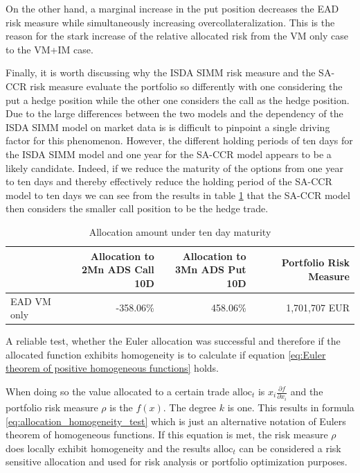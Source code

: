 \documentclass[../Thesis_AHoecherl.tex]{subfiles}
\begin{document}
    On the other hand, a marginal increase in the put position decreases the \gls{EAD} risk measure while simultaneously increasing overcollateralization. This is the reason for the stark increase of the relative allocated risk from the \gls{VM} only case to the \gls{VM}+IM case.

    Finally, it is worth discussing why the \gls{ISDA SIMM} risk measure and the \gls{SA-CCR} risk measure evaluate the portfolio so differently with one considering the put a hedge position while the other one considers the call as the hedge position.
    Due to the large differences between the two models and the dependency of the \gls{ISDA SIMM} model on market data is is difficult to pinpoint a single driving factor for this phenomenon.
    However, the different holding periods of ten days for the \gls{ISDA SIMM} model and one year for the \gls{SA-CCR} model appears to be a likely candidate. Indeed, if we reduce the maturity of the options from one year to ten days and thereby effectively reduce the holding period of the \gls{SA-CCR} model to ten days we can see from the results in table \ref{tab:2TradeEquity10dayEAD} that the \gls{SA-CCR} model then considers the smaller call position to be the hedge trade.

    \begin{table}[htbp]
        \centering
        \begin{tabular}{l||r|r|r}
                & \makecell{Allocation to \\ 2Mn ADS Call 10D} & \makecell{Allocation to \\ 3Mn ADS Put 10D} & Portfolio Risk Measure \\
                \toprule
                \gls{EAD} \gls{VM} only & -358.06\% & 458.06\% & 1,701,707 EUR \\
        \end{tabular}%
        \caption{Allocation amount under ten day maturity}
        \label{tab:2TradeEquity10dayEAD}%
    \end{table}%

    A reliable test, whether the Euler allocation was successful and therefore if the allocated function exhibits homogeneity is to calculate if equation \ref{eq:Euler theorem of positive homogeneous functions} holds.

    When doing so the value allocated to a certain trade $\text{alloc}_{t}$ is $x_i\frac{\partial f}{\partial x_i}$ and the portfolio risk measure $\rho$ is the $f(x)$. The degree $k$ is one. 
    This results in formula \ref{eq:allocation_homogeneity_test} which is just an alternative notation of Eulers theorem of homogeneous functions. If this equation is met, the risk measure $\rho$ does locally exhibit homogeneity and the results $\text{alloc}_t$ can be considered a risk sensitive allocation and used for risk analysis or portfolio optimization purposes.
\end{document}
